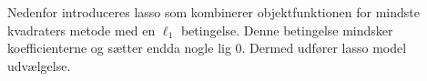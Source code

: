 


%





Nedenfor introduceres lasso som kombinerer objektfunktionen for mindste kvadraters metode med en $\ell_1$ betingelse. Denne betingelse mindsker koefficienterne og sætter endda nogle lig 0. Dermed udfører lasso model udvælgelse.


